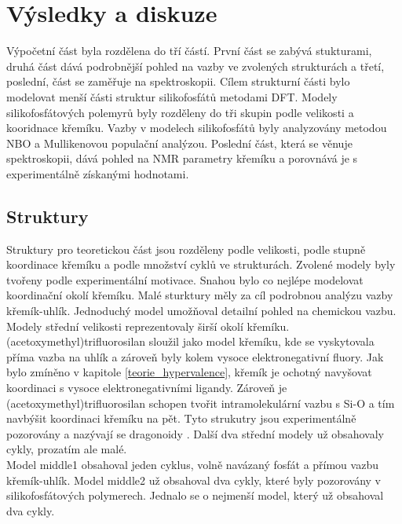 \documentclass[
  digital, %
  table,   %
  lof,     %
  lot,     %
  oneside,
]{fithesis3}
\begin{document}
\chapter{Výsledky a diskuze}
Výpočetní část byla rozdělena do tří částí. První část se zabývá stukturami, druhá část dává podrobnější pohled na vazby ve zvolených strukturách a třetí, poslední, část se zaměřuje na spektroskopii.
Cílem strukturní části bylo modelovat menší části struktur silikofosfátů metodami DFT. Modely silikofosfátových polemyrů byly rozděleny do tři skupin podle velikosti a kooridnace křemíku. Vazby v modelech silikofosfátů byly analyzovány metodou NBO a Mullikenovou populační analýzou. Poslední část, která se věnuje spektroskopii, dává pohled na NMR parametry křemíku a porovnává je s experimentálně získanými hodnotami.

\section{Struktury}
Struktury pro teoretickou část jsou rozděleny podle velikosti, podle stupně koordinace křemíku a podle množství cyklů ve strukturách. Zvolené modely byly tvořeny podle experimentální motivace. Snahou bylo co nejlépe modelovat koordinační okolí křemíku. Malé sturktury měly za cíl podrobnou analýzu vazby křemík-uhlík. Jednoduchý model umožňoval detailní pohled na chemickou vazbu.\\

Modely střední velikosti reprezentovaly širší okolí křemíku. (acetoxymethyl)trifluorosilan sloužil jako model křemíku, kde se vyskytovala příma vazba na uhlík a zároveň byly kolem vysoce elektronegativní fluory. Jak bylo zmíněno v kapitole \ref{teorie_hypervalence}, křemík je ochotný navyšovat koordinaci s vysoce elektronegativními ligandy. Zároveň je (acetoxymethyl)trifluorosilan schopen tvořit intramolekulární vazbu s Si-O a tím navbýšit koordinaci křemíku na pět. Tyto strukutry jsou experimentálně pozorovány a nazývají se dragonoidy \cite{Chipanina2011}. Další dva střední modely už obsahovaly cykly, prozatím ale malé. \\
Model middle1  obsahoval jeden cyklus, volně navázaný fosfát a přímou vazbu křemík-uhlík. Model middle2  už obsahoval dva cykly, které byly pozorovány v silikofosfátových polymerech. Jednalo se o nejmenší model, který už obsahoval dva cykly.\\
\end{document}
